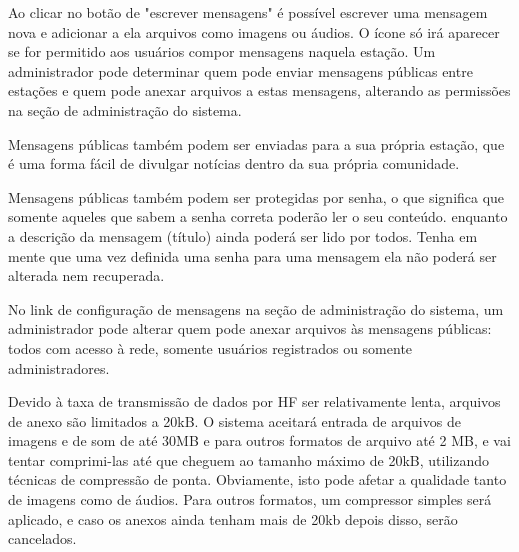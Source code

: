 \documentclass[11pt,a4paper]{article}
\begin{document}
Ao clicar no botão de "escrever mensagens"
é possível escrever uma mensagem nova e adicionar a ela arquivos como imagens ou áudios. O ícone só irá aparecer se for permitido aos usuários compor mensagens naquela estação. Um administrador pode determinar quem pode enviar mensagens públicas entre estações e quem pode anexar arquivos a estas mensagens, alterando as permissões na seção de administração do sistema.



Mensagens públicas também podem ser enviadas para a sua própria estação, que é uma forma fácil de divulgar notícias dentro da sua própria comunidade. 

Mensagens públicas também podem ser protegidas por senha, o que significa que somente aqueles que sabem a senha correta poderão ler o seu conteúdo. enquanto a descrição da mensagem (título) ainda poderá ser lido por todos. Tenha em mente que uma vez definida uma senha para uma mensagem ela não poderá ser alterada nem recuperada. 


No link de configuração de mensagens na seção de administração do sistema, um administrador pode alterar quem pode anexar arquivos às mensagens públicas: todos com acesso à rede, somente usuários registrados ou somente administradores.


Devido à taxa de transmissão de dados por HF ser relativamente lenta, arquivos de anexo são limitados a 20kB. O sistema aceitará entrada de arquivos de imagens e de som de até 30MB e para outros formatos de arquivo até 2 MB, e vai tentar comprimi-las até que cheguem ao tamanho máximo de 20kB, utilizando técnicas de compressão de ponta. Obviamente, isto pode afetar a qualidade tanto de imagens como de áudios. Para outros formatos, um compressor simples será aplicado, e caso os anexos ainda tenham mais de 20kb depois disso, serão cancelados.
\end{document}
